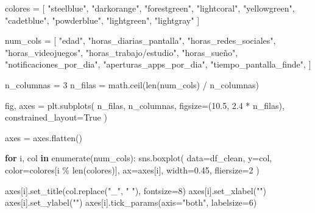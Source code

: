 \documentclass[11pt,spanish,a4paper,]{article}
\newenvironment{Shaded}{\begin{snugshade}}{\end{snugshade}}
\newcommand{\BuiltInTok}[1]{\textcolor[rgb]{0.00,0.23,0.31}{#1}}
\newcommand{\ControlFlowTok}[1]{\textcolor[rgb]{0.00,0.23,0.31}{\textbf{#1}}}
\newcommand{\DecValTok}[1]{\textcolor[rgb]{0.68,0.00,0.00}{#1}}
\newcommand{\FloatTok}[1]{\textcolor[rgb]{0.68,0.00,0.00}{#1}}
\newcommand{\KeywordTok}[1]{\textcolor[rgb]{0.00,0.23,0.31}{\textbf{#1}}}
\newcommand{\NormalTok}[1]{\textcolor[rgb]{0.00,0.23,0.31}{#1}}
\newcommand{\OperatorTok}[1]{\textcolor[rgb]{0.37,0.37,0.37}{#1}}
\newcommand{\StringTok}[1]{\textcolor[rgb]{0.13,0.47,0.30}{#1}}
\newcommand{\VariableTok}[1]{\textcolor[rgb]{0.07,0.07,0.07}{#1}}
\begin{document}
\begin{Shaded}
\begin{Highlighting}[]
\NormalTok{colores }\OperatorTok{=}\NormalTok{ [}
    \StringTok{"steelblue"}\NormalTok{, }\StringTok{"darkorange"}\NormalTok{, }\StringTok{"forestgreen"}\NormalTok{,}
    \StringTok{"lightcoral"}\NormalTok{, }\StringTok{"yellowgreen"}\NormalTok{, }\StringTok{"cadetblue"}\NormalTok{,}
    \StringTok{"powderblue"}\NormalTok{, }\StringTok{"lightgreen"}\NormalTok{, }\StringTok{"lightgray"}
\NormalTok{]}

\NormalTok{num\_cols }\OperatorTok{=}\NormalTok{ [}
    \StringTok{"edad"}\NormalTok{,}
    \StringTok{"horas\_diarias\_pantalla"}\NormalTok{,}
    \StringTok{"horas\_redes\_sociales"}\NormalTok{,}
    \StringTok{"horas\_videojuegos"}\NormalTok{,}
    \StringTok{"horas\_trabajo/estudio"}\NormalTok{,}
    \StringTok{"horas\_sueño"}\NormalTok{,}
    \StringTok{"notificaciones\_por\_dia"}\NormalTok{,}
    \StringTok{"aperturas\_apps\_por\_dia"}\NormalTok{,}
    \StringTok{"tiempo\_pantalla\_finde"}\NormalTok{,}
\NormalTok{]}

\NormalTok{n\_columnas }\OperatorTok{=} \DecValTok{3}
\NormalTok{n\_filas }\OperatorTok{=}\NormalTok{ math.ceil(}\BuiltInTok{len}\NormalTok{(num\_cols) }\OperatorTok{/}\NormalTok{ n\_columnas)}

\NormalTok{fig, axes }\OperatorTok{=}\NormalTok{ plt.subplots(}
\NormalTok{    n\_filas,}
\NormalTok{    n\_columnas,}
\NormalTok{    figsize}\OperatorTok{=}\NormalTok{(}\FloatTok{10.5}\NormalTok{, }\FloatTok{2.4} \OperatorTok{*}\NormalTok{ n\_filas),}
\NormalTok{    constrained\_layout}\OperatorTok{=}\VariableTok{True}
\NormalTok{)}

\NormalTok{axes }\OperatorTok{=}\NormalTok{ axes.flatten()}

\ControlFlowTok{for}\NormalTok{ i, col }\KeywordTok{in} \BuiltInTok{enumerate}\NormalTok{(num\_cols):}
\NormalTok{    sns.boxplot(}
\NormalTok{        data}\OperatorTok{=}\NormalTok{df\_clean,}
\NormalTok{        y}\OperatorTok{=}\NormalTok{col,}
\NormalTok{        color}\OperatorTok{=}\NormalTok{colores[i }\OperatorTok{\%} \BuiltInTok{len}\NormalTok{(colores)],}
\NormalTok{        ax}\OperatorTok{=}\NormalTok{axes[i],}
\NormalTok{        width}\OperatorTok{=}\FloatTok{0.45}\NormalTok{,}
\NormalTok{        fliersize}\OperatorTok{=}\DecValTok{2}
\NormalTok{    )}

\NormalTok{    axes[i].set\_title(col.replace(}\StringTok{"\_"}\NormalTok{, }\StringTok{" "}\NormalTok{), fontsize}\OperatorTok{=}\DecValTok{8}\NormalTok{)}
\NormalTok{    axes[i].set\_xlabel(}\StringTok{""}\NormalTok{)}
\NormalTok{    axes[i].set\_ylabel(}\StringTok{""}\NormalTok{)}
\NormalTok{    axes[i].tick\_params(axis}\OperatorTok{=}\StringTok{"both"}\NormalTok{, labelsize}\OperatorTok{=}\DecValTok{6}\NormalTok{)}


\end{Highlighting}
\end{Shaded}
\end{document}
